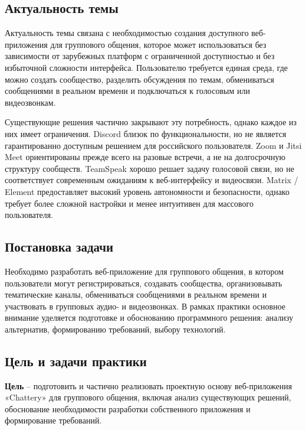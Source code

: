 \documentclass[a4paper,12pt]{extarticle}
\begin{document}
\subsection{Актуальность темы}

Актуальность темы связана с необходимостью создания доступного веб-приложения для группового общения, которое может использоваться без зависимости от зарубежных платформ с ограниченной доступностью и без избыточной сложности интерфейса. Пользователю требуется единая среда, где можно создать сообщество, разделить обсуждения по темам, обмениваться сообщениями в реальном времени и подключаться к голосовым или видеозвонкам.

Существующие решения частично закрывают эту потребность, однако каждое из них имеет ограничения. Discord близок по функциональности, но не является гарантированно доступным решением для российского пользователя. Zoom и Jitsi Meet ориентированы прежде всего на разовые встречи, а не на долгосрочную структуру сообществ. TeamSpeak хорошо решает задачу голосовой связи, но не соответствует современным ожиданиям к веб-интерфейсу и видеосвязи. Matrix / Element предоставляет высокий уровень автономности и безопасности, однако требует более сложной настройки и менее интуитивен для массового пользователя.

\subsection{Постановка задачи}

Необходимо разработать веб-приложение для группового общения, в котором пользователи могут регистрироваться, создавать сообщества, организовывать тематические каналы, обмениваться сообщениями в реальном времени и участвовать в групповых аудио- и видеозвонках. В рамках практики основное внимание уделяется подготовке и обоснованию программного решения: анализу альтернатив, формированию требований, выбору технологий.

\subsection{Цель и задачи практики}

\textbf{Цель} -- подготовить и частично реализовать проектную основу веб-приложения «Chattery» для группового общения, включая анализ существующих решений, обоснование необходимости разработки собственного приложения и формирование требований.
\end{document}
